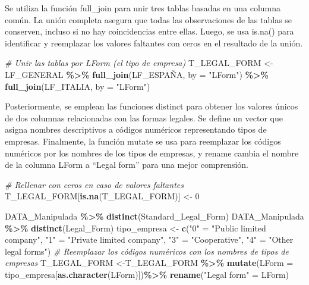 \documentclass[
]{article}
\newenvironment{Shaded}{\begin{snugshade}}{\end{snugshade}}
\newcommand{\AttributeTok}[1]{\textcolor[rgb]{0.13,0.29,0.53}{#1}}
\newcommand{\CommentTok}[1]{\textcolor[rgb]{0.56,0.35,0.01}{\textit{#1}}}
\newcommand{\DecValTok}[1]{\textcolor[rgb]{0.00,0.00,0.81}{#1}}
\newcommand{\FunctionTok}[1]{\textcolor[rgb]{0.13,0.29,0.53}{\textbf{#1}}}
\newcommand{\NormalTok}[1]{#1}
\newcommand{\OtherTok}[1]{\textcolor[rgb]{0.56,0.35,0.01}{#1}}
\newcommand{\SpecialCharTok}[1]{\textcolor[rgb]{0.81,0.36,0.00}{\textbf{#1}}}
\newcommand{\StringTok}[1]{\textcolor[rgb]{0.31,0.60,0.02}{#1}}
\begin{document}
Se utiliza la función full\_join para unir tres tablas basadas en una
columna común. La unión completa asegura que todas las observaciones de
las tablas se conserven, incluso si no hay coincidencias entre ellas.
Luego, se usa is.na() para identificar y reemplazar los valores
faltantes con ceros en el resultado de la unión.

\begin{Shaded}
\begin{Highlighting}[]
\CommentTok{\# Unir las tablas por \textquotesingle{}LForm\textquotesingle{} (el tipo de empresa)}
\NormalTok{T\_LEGAL\_FORM }\OtherTok{\textless{}{-}}\NormalTok{ LF\_GENERAL }\SpecialCharTok{\%\textgreater{}\%}
  \FunctionTok{full\_join}\NormalTok{(LF\_ESPAÑA, }\AttributeTok{by =} \StringTok{"LForm"}\NormalTok{) }\SpecialCharTok{\%\textgreater{}\%}
  \FunctionTok{full\_join}\NormalTok{(LF\_ITALIA, }\AttributeTok{by =} \StringTok{"LForm"}\NormalTok{)}
\end{Highlighting}
\end{Shaded}

Posteriormente, se emplean las funciones distinct para obtener los
valores únicos de dos columnas relacionadas con las formas legales. Se
define un vector que asigna nombres descriptivos a códigos numéricos
representando tipos de empresas. Finalmente, la función mutate se usa
para reemplazar los códigos numéricos por los nombres de los tipos de
empresas, y rename cambia el nombre de la columna LForm a ``Legal form''
para una mejor comprensión.

\begin{Shaded}
\begin{Highlighting}[]
\CommentTok{\# Rellenar con ceros en caso de valores faltantes}
\NormalTok{T\_LEGAL\_FORM[}\FunctionTok{is.na}\NormalTok{(T\_LEGAL\_FORM)] }\OtherTok{\textless{}{-}} \DecValTok{0}

\NormalTok{DATA\_Manipulada }\SpecialCharTok{\%\textgreater{}\%} \FunctionTok{distinct}\NormalTok{(Standard\_Legal\_Form)}
\NormalTok{DATA\_Manipulada }\SpecialCharTok{\%\textgreater{}\%} \FunctionTok{distinct}\NormalTok{(Legal\_Form)}
\NormalTok{tipo\_empresa }\OtherTok{\textless{}{-}} \FunctionTok{c}\NormalTok{(}\StringTok{"0"} \OtherTok{=} \StringTok{"Public limited company"}\NormalTok{, }
                  \StringTok{"1"} \OtherTok{=} \StringTok{"Private limited company"}\NormalTok{, }
                  \StringTok{"3"} \OtherTok{=} \StringTok{"Cooperative"}\NormalTok{, }
                  \StringTok{"4"} \OtherTok{=} \StringTok{"Other legal forms"}\NormalTok{)}
\CommentTok{\# Reemplazar los códigos numéricos con los nombres de tipos de empresas}
\NormalTok{T\_LEGAL\_FORM }\OtherTok{\textless{}{-}}\NormalTok{T\_LEGAL\_FORM }\SpecialCharTok{\%\textgreater{}\%}
  \FunctionTok{mutate}\NormalTok{(}\AttributeTok{LForm =}\NormalTok{ tipo\_empresa[}\FunctionTok{as.character}\NormalTok{(LForm)])}\SpecialCharTok{\%\textgreater{}\%} 
  \FunctionTok{rename}\NormalTok{(}\StringTok{"Legal form"} \OtherTok{=}\NormalTok{ LForm)}
\end{Highlighting}
\end{Shaded}
\end{document}
